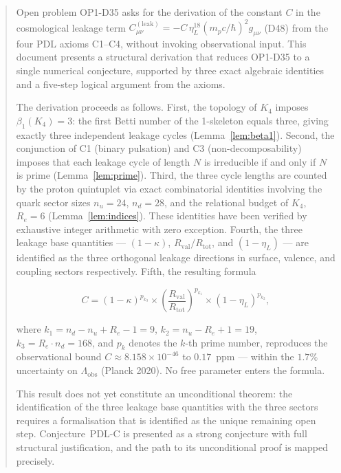 \documentclass[12pt,a4paper]{article}
\newcommand{\Kfour}{K_4}
\newcommand{\hb}{\hbar}
\newcommand{\Rtot}{R_{\mathrm{tot}}}
\newcommand{\Rval}{R_{\mathrm{val}}}
\renewcommand{\Re}{R_e}
\newcommand{\kap}{\kappa}
\newcommand{\etaL}{\eta_L}
\newcommand{\pk}[1]{p_{#1}}
\newcommand{\Lam}{\Lambda}
\begin{document}
\begin{abstract}
Open problem OP1-D35 asks for the derivation of the constant $C$ in the cosmological leakage term $C^{(\mathrm{leak})}_{\mu\nu} = -C\,\etaL^{18}(m_p c/\hb)^2 g_{\mu\nu}$ (D48) from the four PDL axioms C1--C4, without invoking observational input. This document presents a structural derivation that reduces OP1-D35 to a single numerical conjecture, supported by three exact algebraic identities and a five-step logical argument from the axioms.

The derivation proceeds as follows. First, the topology of $\Kfour$ imposes $\beta_1(\Kfour) = 3$: the first Betti number of the 1-skeleton equals three, giving exactly three independent leakage cycles (Lemma~\ref{lem:beta1}). Second, the conjunction of C1 (binary pulsation) and C3 (non-decomposability) imposes that each leakage cycle of length $N$ is irreducible if and only if $N$ is prime (Lemma~\ref{lem:prime}). Third, the three cycle lengths are counted by the proton quintuplet via exact combinatorial identities involving the quark sector sizes $n_u = 24$, $n_d = 28$, and the relational budget of $\Kfour$, $\Re = 6$ (Lemma~\ref{lem:indices}). These identities have been verified by exhaustive integer arithmetic with zero exception. Fourth, the three leakage base quantities — $(1-\kap)$, $\Rval/\Rtot$, and $(1-\etaL)$ — are identified as the three orthogonal leakage directions in surface, valence, and coupling sectors respectively. Fifth, the resulting formula

\begin{equation*}
C = (1-\kap)^{\pk{k_3}} \times \left(\frac{\Rval}{\Rtot}\right)^{\pk{k_1}} \times (1-\etaL)^{\pk{k_2}},
\end{equation*}

where $k_1 = n_d - n_u + \Re - 1 = 9$, $k_2 = n_u - \Re + 1 = 19$, $k_3 = \Re \cdot n_d = 168$, and $\pk{k}$ denotes the $k$-th prime number, reproduces the observational bound $C \approx 8.158 \times 10^{-46}$ to $0.17$~ppm — within the $1.7\%$ uncertainty on $\Lam_{\mathrm{obs}}$ (Planck 2020). No free parameter enters the formula.

This result does not yet constitute an unconditional theorem: the identification of the three leakage base quantities with the three sectors requires a formalisation that is identified as the unique remaining open step. Conjecture~PDL-C is presented as a strong conjecture with full structural justification, and the path to its unconditional proof is mapped precisely.
\end{abstract}
\end{document}
